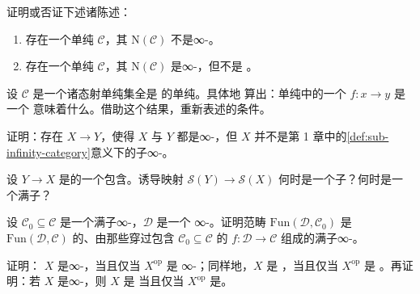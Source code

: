 \begin{exercise}\label{ex:coherent-nerve-existence}
证明或否证下述诸陈述：
\begin{enumerate}[label=(\arabic*)]
  \item 存在一个单纯\trCategory{} $\mathcal{C}$，其\trCoherentNerve{}%
        $\mathrm{N}(\mathcal{C})$ 不是∞-\trCategory{}。
  \item 存在一个单纯\trCategory{} $\mathcal{C}$，其\trCoherentNerve{}%
        $\mathrm{N}(\mathcal{C})$ 是∞-\trCategory{}，但不是 \trKanComplex{}。
\end{enumerate}
\end{exercise}

\begin{exercise}\label{ex:simplicial-equivalence-weakly-fully-faithful}
设 $\mathcal{C}$ 是一个诸态射单纯集全是 \trKanComplex{} 的单纯\trCategory{}。具体地
算出：单纯\trCategory{}中的一个\trMorphism{} $f\colon x \to y$ 是一个\trEquivalence{}%
意味着什么。借助这个结果，重新表述\trWeaklyFullyFaithful{}\trFunctor{}的条件。
\end{exercise}

\begin{exercise}\label{ex:mono-not-subcategory}
证明：存在\trMonomorphism{} $X \to Y$，使得 $X$ 与 $Y$ 都是∞-\trCategories{}，但 $X$
并不是第 1 章中的\cref{def:sub-infinity-category}意义下的子∞-\trCategory{}。
\end{exercise}

\begin{exercise}\label{ex:singular-subcategory}
设 $Y \to X$ 是\trTopologicalSpace{}的一个包含。诱导映射 $\mathcal{S}(Y) \to \mathcal{S}(X)$
何时是一个子\trCategory{}？何时是一个满子\trCategory{}？
\end{exercise}

\begin{exercise}\label{ex:functor-category-full-sub}
设 $\mathcal{C}_0 \subseteq \mathcal{C}$ 是一个满子∞-\trCategory{}，$\mathcal{D}$ 是一个
∞-\trCategory{}。证明\trFunctor{}范畴 $\mathrm{Fun}(\mathcal{D}, \mathcal{C}_0)$ 是
$\mathrm{Fun}(\mathcal{D}, \mathcal{C})$ 的、由那些穿过包含
$\mathcal{C}_0 \subseteq \mathcal{C}$ 的\trFunctor{} $f\colon \mathcal{D} \to \mathcal{C}$
组成的满子∞-\trCategory{}。
\end{exercise}

\begin{exercise}\label{ex:op-infinity-category}
证明：\trSimplicialSet{} $X$ 是∞-\trCategory{}，当且仅当 $X^{\mathrm{op}}$ 是%
∞-\trCategory{}；同样地，$X$ 是 \trKanComplex{}，当且仅当 $X^{\mathrm{op}}$ 是%
\trKanComplex{}。再证明：若 $X$ 是∞-\trCategory{}，则 $X$ 是\trInfinityGroupoid{}%
当且仅当 $X^{\mathrm{op}}$ 是\trInfinityGroupoid{}。
\end{exercise}

